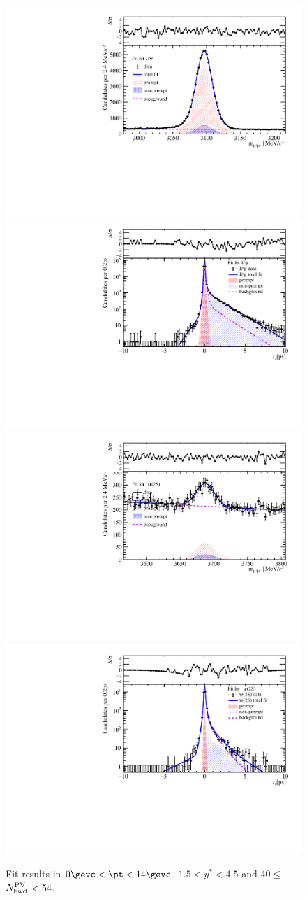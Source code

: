 \begin{figure}[H]
\begin{center}
\includegraphics[width=0.45\linewidth]{pdf/Pbp/BWorkdir/TwoDimFit/ProjMass/Jpsi_n4y1pt1.pdf}
\includegraphics[width=0.45\linewidth]{pdf/Pbp/BWorkdir/TwoDimFit/ProjTz/Jpsi_n4y1pt1.pdf}
\vspace*{-0.5cm}
\includegraphics[width=0.45\linewidth]{pdf/Pbp/BWorkdir/TwoDimFit/ProjMass/Psi2S_n4y1pt1.pdf}
\includegraphics[width=0.45\linewidth]{pdf/Pbp/BWorkdir/TwoDimFit/ProjTz/Psi2S_n4y1pt1.pdf}
\vspace*{-0.5cm}
\end{center}
\caption{Fit results in $0\gevc<\pt<14\gevc$, $1.5<y^*<4.5$ and 40$\leq$$N_{\rm bwd}^{\rm PV}$$<$54.}
\end{figure}
